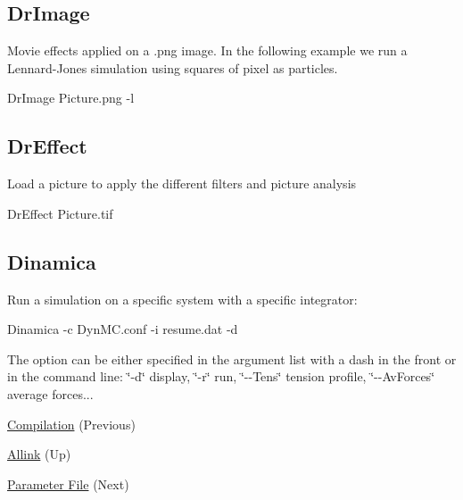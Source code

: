 \hypertarget{usage_page_DrImage_section}{}\subsection{\-Dr\-Image}\label{usage_page_DrImage_section}
\-Movie effects applied on a .png image. \-In the following example we run a \-Lennard-\/\-Jones simulation using squares of pixel as particles. 
\begin{DoxyCode}
DrImage Picture.png -l
\end{DoxyCode}
\hypertarget{usage_page_DrEffect_section}{}\subsection{\-Dr\-Effect}\label{usage_page_DrEffect_section}
\-Load a picture to apply the different filters and picture analysis 
\begin{DoxyCode}
DrEffect Picture.tif
\end{DoxyCode}
\hypertarget{usage_page_Dinamica_section}{}\subsection{\-Dinamica}\label{usage_page_Dinamica_section}
\-Run a simulation on a specific system with a specific integrator\-: 
\begin{DoxyCode}
Dinamica -c DynMC.conf -i resume.dat -d 
\end{DoxyCode}
 \-The option can be either specified in the argument list with a dash in the front or in the command line\-: \char`\"{}-\/d\char`\"{} display, \char`\"{}-\/r\char`\"{} run, \char`\"{}-\/-\/\-Tens\char`\"{} tension profile, \char`\"{}-\/-\/\-Av\-Forces\char`\"{} average forces...


\begin{DoxyItemize}
\item \hyperlink{compile_page}{\-Compilation} (\-Previous)  
\item \hyperlink{index}{\-Allink} (\-Up)  
\item \hyperlink{param_page}{\-Parameter \-File} (\-Next)  
\end{DoxyItemize}
